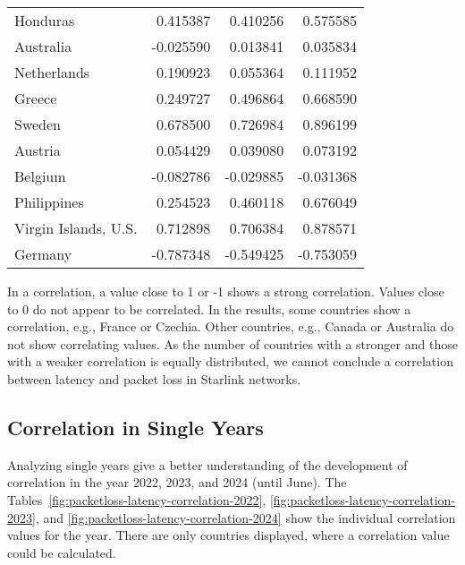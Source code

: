 \begin{table}[ht]
\begin{tabular}{lrrr}
		Honduras                    & 0.415387    & 0.410256    & 0.575585    \\
		Australia                   & -0.025590   & 0.013841    & 0.035834    \\
		Netherlands                 & 0.190923    & 0.055364    & 0.111952    \\
		Greece                      & 0.249727    & 0.496864    & 0.668590    \\
		Sweden                      & 0.678500    & 0.726984    & 0.896199    \\
		Austria                     & 0.054429    & 0.039080    & 0.073192    \\
		Belgium                     & -0.082786   & -0.029885   & -0.031368   \\
		Philippines                 & 0.254523    & 0.460118    & 0.676049    \\
		Virgin Islands, U.S.        & 0.712898    & 0.706384    & 0.878571    \\
		Germany                     & -0.787348   & -0.549425   & -0.753059   \\
		\bottomrule
	\end{tabular}
\end{table}

In a correlation, a value close to 1 or -1 shows a strong correlation. Values
close to 0 do not appear to be correlated. In the results, some countries show
a correlation, e.g., France or Czechia. Other countries, e.g., Canada or
Australia do not show correlating values. As the number of countries with a
stronger and those with a weaker correlation is equally distributed, we cannot
conclude a correlation between latency and packet loss in Starlink networks.

\subsection*{Correlation in Single Years}

Analyzing single years give a better understanding of the development of
correlation in the year 2022, 2023, and 2024 (until June). The
Tables~\ref{fig:packetloss-latency-correlation-2022},
\ref{fig:packetloss-latency-correlation-2023}, and
\ref{fig:packetloss-latency-correlation-2024} show the individual correlation
values for the year. There are only countries displayed, where a correlation
value could be calculated.

